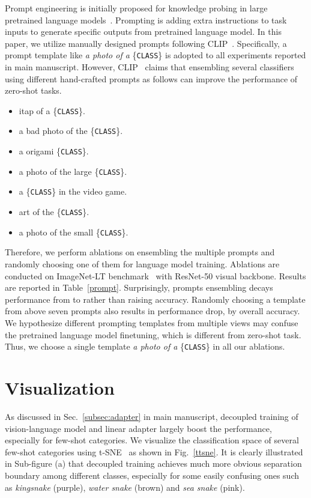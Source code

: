 \documentclass[10pt,twocolumn,letterpaper]{article}
\begin{document}
Prompt engineering is initially proposed for knowledge probing in large pretrained language models~\cite{petroni2019language, shin2020eliciting, li2021prefix, jiang2020can}. Prompting is adding extra instructions to task inputs to generate specific outputs from pretrained language model. In this paper, we utilize manually designed prompts following CLIP~\cite{radford2021learning}. Specifically, a prompt template like \textit{a photo of a} \{\texttt{CLASS}\} is adopted to all experiments reported in main manuscript. However, CLIP~\cite{radford2021learning} claims that ensembling several classifiers using different hand-crafted prompts as follows can improve the performance of zero-shot tasks.

\begin{itemize}
    \item itap of a \{\texttt{CLASS}\}.
    \item a bad photo of the \{\texttt{CLASS}\}.
    \item a origami \{\texttt{CLASS}\}.
    \item a photo of the large \{\texttt{CLASS}\}.
    \item a \{\texttt{CLASS}\} in the video game.
    \item art of the \{\texttt{CLASS}\}.
    \item a photo of the small \{\texttt{CLASS}\}.
\end{itemize}

Therefore, we perform ablations on ensembling the multiple prompts and randomly choosing one of them for language model training. Ablations are conducted on ImageNet-LT benchmark~\cite{liu2019large} with ResNet-50 visual backbone. Results are reported in Table~\ref{prompt}. Surprisingly, prompts ensembling decays performance from  to  rather than raising accuracy. Randomly choosing a template from above seven prompts also results in performance drop, by  overall accuracy. We hypothesize different prompting templates from multiple views may confuse the pretrained language model finetuning, which is different from zero-shot task. Thus, we choose a single template \textit{a photo of a} \{\texttt{CLASS}\} in all our ablations.


\section{Visualization}
\label{visualization}
As discussed in Sec.~\ref{subsec:adapter} in main manuscript, decoupled training of vision-language model and linear adapter largely boost the performance, especially for few-shot categories. We visualize the classification space of several few-shot categories using t-SNE~\cite{van2008visualizing} as shown in Fig.~\ref{ttsne}. It is clearly illustrated in Sub-figure (a) that decoupled training achieves much more obvious separation boundary among different classes, especially for some easily confusing ones such as \textit{kingsnake} (purple), \textit{water snake} (brown) and \textit{sea snake} (pink).
\end{document}

